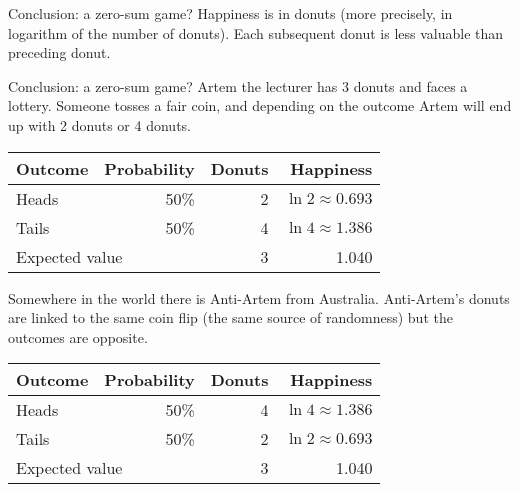 \documentclass{beamer}
\begin{document}
\begin{frame}{Conclusion: a zero-sum game?}
\justify
Happiness is in donuts (more precisely, in logarithm of the number of donuts). Each subsequent donut is less valuable than preceding donut. 

\justify
\centering
{}
\end{frame}



\begin{frame}{Conclusion: a zero-sum game?}
\justify
Artem the lecturer has 3 donuts and faces a lottery. Someone tosses a fair coin, and depending on the outcome Artem will end up with 2 donuts or 4 donuts.

\justify
\centering
\begin{tabular}{l|r|r|r}
Outcome & Probability & Donuts & Happiness \\ \hline
Heads & 50\% & 2 & $\ln 2 \approx 0.693$ \\
Tails & 50\% & 4 & $\ln 4 \approx 1.386$ \\ \hline
\multicolumn{2}{l|}{Expected value} & 3 & 1.040
\end{tabular}

\justify
Somewhere in the world there is Anti-Artem from Australia. Anti-Artem's donuts are linked to the same coin flip (the same source of randomness) but the outcomes are opposite.

\justify
\centering
\begin{tabular}{l|r|r|r}
Outcome & Probability & Donuts & Happiness \\ \hline
Heads & 50\% & 4 & $\ln 4 \approx 1.386$ \\ 
Tails & 50\% & 2 & $\ln 2 \approx 0.693$ \\ \hline
\multicolumn{2}{l|}{Expected value} & 3 & 1.040
\end{tabular}
\end{frame}
\end{document}
